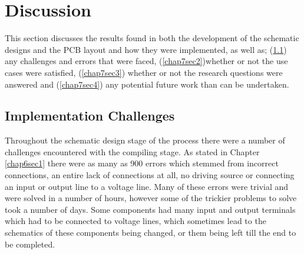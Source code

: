 
\chapter{Discussion} %

\label{Chapter7} %

This section discusses the results found in both the development of the schematic designs and the PCB layout and  how they were implemented, as well as; (\ref{chap7sec1}) any challenges and errors that were faced, (\ref{chap7sec2})whether or not the use cases were satisfied, (\ref{chap7sec3}) whether or not the research questions were answered and (\ref{chap7sec4}) any potential future work than can be undertaken.

\section{Implementation Challenges}
\label{chap7sec1}

	Throughout the schematic design stage of the process there were a number of challenges encountered with the compiling stage. 
As stated in Chapter \ref{chap6sec1} there were as many as 900 errors which stemmed from incorrect connections, an entire lack of connections at all, no driving source or connecting an input or output line to a voltage line. 
Many of these errors were trivial and were solved in a number of hours, however some of the trickier problems to solve took a number of days.
Some components had many input and output terminals which had to be connected to voltage lines, which sometimes lead to the schematics of these components being changed, or them being left till the end to be completed.\\

